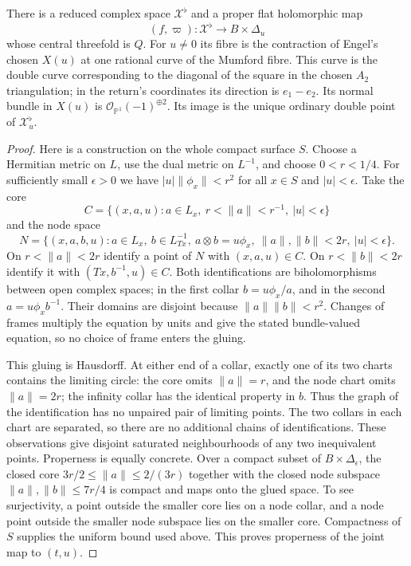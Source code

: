 \begin{theorem}\label{push:src:A.1.2}\label{push:A12}
There is a reduced complex space $\mathcal X^\flat$ and a proper flat
holomorphic map
\[
 (f,\varpi):\mathcal X^\flat\longrightarrow B\times\Delta_u
\]
whose central threefold is $Q$. For $u\ne0$ its fibre is the
contraction of Engel's chosen $X(u)$ at one rational curve of the
Mumford fibre. This curve is the double curve corresponding to the
diagonal of the square in the chosen $A_2$ triangulation; in the
return's coordinates its direction is $e_1-e_2$. Its normal bundle
in $X(u)$ is $\mathcal O_{\mathbb P^1}(-1)^{\oplus2}$. Its image is
the unique ordinary double point of $\mathcal X^\flat_u$.
\end{theorem}
\begin{proof}
Here is a construction on the whole compact surface $S$. Choose a
Hermitian metric on $L$, use the dual metric on $L^{-1}$, and choose
$0<r<1/4$. For sufficiently small $\epsilon>0$ we have
$|u|\|\phi_x\|<r^2$ for all $x\in S$ and $|u|<\epsilon$.
Take the core
\[
 C=\{(x,a,u):a\in L_x,\ r<\|a\|<r^{-1},\ |u|<\epsilon\}
\]
and the node space
\[
 N=\{(x,a,b,u):a\in L_x,\ b\in L^{-1}_{Tx},\
 a\otimes b=u\phi_x,\ \|a\|,\|b\|<2r,\ |u|<\epsilon\}.
\]
On $r<\|a\|<2r$ identify a point of $N$ with $(x,a,u)\in C$.
On $r<\|b\|<2r$ identify it with $(Tx,b^{-1},u)\in C$.
Both identifications are biholomorphisms between open complex spaces;
in the first collar $b=u\phi_x/a$, and in the second
$a=u\phi_xb^{-1}$. Their domains are disjoint because
$\|a\|\|b\|<r^2$. Changes of frames multiply the equation by
units and give the stated bundle-valued equation, so no choice of
frame enters the gluing.

This gluing is Hausdorff. At either end of a collar, exactly one
of its two charts contains the limiting circle: the core omits
$\|a\|=r$, and the node chart omits $\|a\|=2r$; the infinity
collar has the identical property in $b$. Thus the graph of the
identification has no unpaired pair of limiting points. The two
collars in each chart are separated, so there are no additional
chains of identifications. These observations give disjoint
saturated neighbourhoods of any two inequivalent points. Properness
is equally concrete. Over a compact subset of $B\times\Delta_\epsilon$,
the closed core $3r/2\leq\|a\|\leq2/(3r)$ together with the
closed node subspace $\|a\|,\|b\|\leq7r/4$ is compact and maps
onto the glued space. To see surjectivity, a point outside the smaller
core lies on a node collar, and a node point outside the smaller
node subspace lies on the smaller core. Compactness of $S$ supplies
the uniform bound used above. This proves properness of the joint
map to $(t,u)$.


\end{proof}
